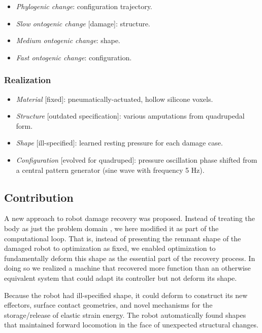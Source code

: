 \begin{itemize}
    \item \textit{Phylogenic change}: configuration trajectory.
    \item \textit{Slow ontogenic change} [damage]: structure.
    \item \textit{Medium ontogenic change}: shape.
    \item \textit{Fast ontogenic change}: configuration.
\end{itemize}


\subsubsection*{Realization}

\begin{itemize}
    \item \textit{Material} [fixed]: pneumatically-actuated, hollow silicone voxels.
    \item \textit{Structure} [outdated specification]: various amputations from quadrupedal form.
    \item \textit{Shape} [ill-specified]: learned resting pressure for each damage case.
    \item \textit{Configuration} [evolved for quadruped]: pressure oscillation phase shifted from a central pattern generator (sine wave with frequency 5 Hz).
\end{itemize}



\subsection{Contribution}



A new approach to robot damage recovery was proposed.
Instead of treating the body as just the problem domain \cite{bongard2006resilient,cully2015robots}, we here modified it as part of the computational loop.
That is, 
instead of presenting the remnant shape of the damaged robot to optimization as 
fixed, we enabled optimization to fundamentally deform this shape as the essential part of the recovery process.
In doing so we realized a machine that recovered more function than an otherwise equivalent system that could adapt its controller but not deform its shape.

Because the robot had ill-specified shape,
it could deform to construct its new effectors, surface contact geometries, and novel mechanisms for the storage/release of elastic strain energy.
The robot automatically found shapes that maintained forward locomotion in the face of unexpected structural changes.

